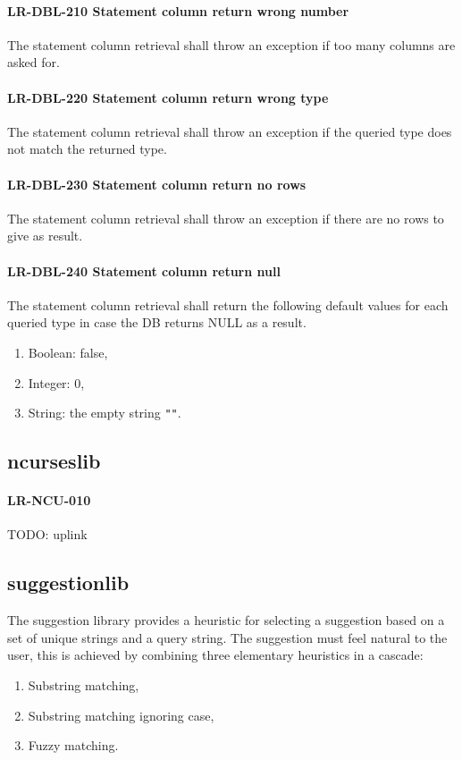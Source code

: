 \paragraph{LR-DBL-210 Statement column return wrong number}
The statement column retrieval shall throw an exception if too many
columns are asked for.

\paragraph{LR-DBL-220 Statement column return wrong type}
The statement column retrieval shall throw an exception if the
queried type does not match the returned type.

\paragraph{LR-DBL-230 Statement column return no rows}
The statement column retrieval shall throw an exception if
there are no rows to give as result.

\paragraph{LR-DBL-240 Statement column return null}
The statement column retrieval shall return the following
default values for each queried type in case the DB returns
NULL as a result.
\begin{enumerate}
\item Boolean: false,
\item Integer: 0,
\item String: the empty string \lstinline{""}.
\end{enumerate}

\subsection{ncurses\textunderscore lib}
\paragraph{LR-NCU-010}
TODO: uplink

\subsection{suggestion\textunderscore lib}
The suggestion library provides a heuristic for selecting a suggestion
based on a set of unique strings and a query string. The suggestion
must feel natural to the user, this is achieved by combining three
elementary heuristics in a cascade:
\begin{enumerate}
\item Substring matching,
\item Substring matching ignoring case,
\item Fuzzy matching.
\end{enumerate}

